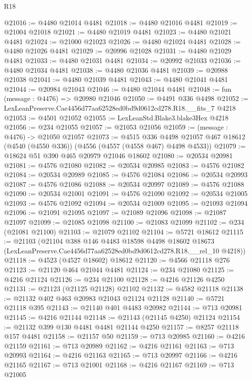 \begin{lexlean}{R18}
\begin{coremodule}
@21016 := @4480 @21014 @4481
@21018 := @4480 @21016 @4481
@21019 := @21004 @21018
@21021 := @4480 @21019 @4481
@21023 := @4480 @21021 @4481
@21024 := @21000 @21023
@21026 := @4480 @21024 @4481
@21028 := @4480 @21026 @4481
@21029 := @20996 @21028
@21031 := @4480 @21029 @4481
@21033 := @4480 @21031 @4481
@21034 := @20992 @21033
@21036 := @4480 @21034 @4481
@21038 := @4480 @21036 @4481
@21039 := @20988 @21038
@21041 := @4480 @21039 @4481
@21043 := @4480 @21041 @4481
@21044 := @20984 @21043
@21046 := @4480 @21044 @4481
@21048 := fun (message : @4476) => @20980 @21046
@21050 := @4491 @336 @4498
@21052 := LexLeanPreserve.Cae4456d77aa62528ed0bd9d0612cd278.R18.__fits_7 @4218
@21053 := @4501 @21052
@21055 := LexLeanStd.Blake3.blake3Hex @4218
@21056 := @234 @21055
@21057 := @21053 @21056
@21059 := (message : @4476) -> @21050 @21057
@21073 := @4515
    @336
    @4498
    @21057
    @467
    @18612
    (@4540 (@4550 @336))
    (@4556 (@4557 (@4558 @467) @4498 @4533))
@21079 := @18624 @51 @390 @465 @20979 @21046 @18602
@21080 := @20534 @20981
@21081 := @4576 @21080
@21082 := @20534 @20985
@21083 := @4576 @21082
@21084 := @20534 @20989
@21085 := @4576 @21084
@21086 := @20534 @20993
@21087 := @4576 @21086
@21088 := @20534 @20997
@21089 := @4576 @21088
@21090 := @20534 @21001
@21091 := @4576 @21090
@21092 := @20534 @21005
@21093 := @4576 @21092
@21094 := @20534 @21009
@21095 := @21093 @21094
@21096 := @21091 @21095
@21097 := @21089 @21096
@21098 := @21087 @21097
@21099 := @21085 @21098
@21100 := @21083 @21099
@21102 := @234 (@21081 @21100)
@21103 := @21079 @21102
@21104 := @5721 @18612
@21115 := @21103
    (@21104
      @388
      @146
      @4483
      @18598
      @4498
      @18602
      @18673
      (LexLeanPreserve.Cae4456d77aa62528ed0bd9d0612cd278.R18.__rel_10 @4218))
@21118 := @4523 (@4527 @18602) @18612
@21120 := @4566 @21118 @276
@21123 := @21120 @464 @21044 @4481
@21124 := @234 @21080
@21125 := @4216 @21124
@21126 := @234 @21100
@21128 := @4216 @21126 @4250
@21131 := @21123 (@21125 @21128) @21102
@21132 := @4582 @21118
@21138 := @21132 @402 @463 @20983 @21043 @21124 @21128
@21140 := @5721 @21118 @395
@21143 := @21140 @401 @4483 @20982
@21144 := @713 @20981
@21145 := @4216 @21144
@21148 := @21143 (@21145 @4250) @21124
@21154 := @21132 @399 @130 @4481 @4481 @21144 @4250
@21157 := @8257 @21118 @157 @4481
@21158 := @21157 @50
@21159 := @713 @20985
@21160 := @4216 @21159
@21161 := @713 @20989
@21162 := @4216 @21161
@21163 := @713 @20993
@21164 := @4216 @21163
@21165 := @713 @20997
@21166 := @4216 @21165
@21167 := @713 @21001
@21168 := @4216 @21167
@21169 := @713 @21005

\end{coremodule}
\end{lexlean}
